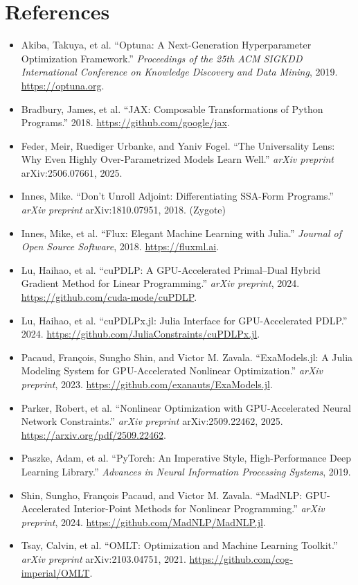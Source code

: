 \documentclass[11pt]{article}
\begin{document}
\section{References}
\begin{itemize}[leftmargin=1.5em]
  \item Akiba, Takuya, et al. ``Optuna: A Next-Generation Hyperparameter Optimization Framework.'' \emph{Proceedings of the 25th ACM SIGKDD International Conference on Knowledge Discovery and Data Mining}, 2019. \url{https://optuna.org}.
  \item Bradbury, James, et al. ``JAX: Composable Transformations of Python Programs.'' 2018. \url{https://github.com/google/jax}.
  \item Feder, Meir, Ruediger Urbanke, and Yaniv Fogel. ``The Universality Lens: Why Even Highly Over-Parametrized Models Learn Well.'' \emph{arXiv preprint} arXiv:2506.07661, 2025.
  \item Innes, Mike. ``Don't Unroll Adjoint: Differentiating SSA-Form Programs.'' \emph{arXiv preprint} arXiv:1810.07951, 2018. (Zygote)
  \item Innes, Mike, et al. ``Flux: Elegant Machine Learning with Julia.'' \emph{Journal of Open Source Software}, 2018. \url{https://fluxml.ai}.
  \item Lu, Haihao, et al. ``cuPDLP: A GPU-Accelerated Primal–Dual Hybrid Gradient Method for Linear Programming.'' \emph{arXiv preprint}, 2024. \url{https://github.com/cuda-mode/cuPDLP}.
  \item Lu, Haihao, et al. ``cuPDLPx.jl: Julia Interface for GPU-Accelerated PDLP.'' 2024. \url{https://github.com/JuliaConstraints/cuPDLPx.jl}.
  \item Pacaud, François, Sungho Shin, and Victor M. Zavala. ``ExaModels.jl: A Julia Modeling System for GPU-Accelerated Nonlinear Optimization.'' \emph{arXiv preprint}, 2023. \url{https://github.com/exanauts/ExaModels.jl}.
  \item Parker, Robert, et al. ``Nonlinear Optimization with GPU-Accelerated Neural Network Constraints.'' \emph{arXiv preprint} arXiv:2509.22462, 2025. \url{https://arxiv.org/pdf/2509.22462}.
  \item Paszke, Adam, et al. ``PyTorch: An Imperative Style, High-Performance Deep Learning Library.'' \emph{Advances in Neural Information Processing Systems}, 2019.
  \item Shin, Sungho, François Pacaud, and Victor M. Zavala. ``MadNLP: GPU-Accelerated Interior-Point Methods for Nonlinear Programming.'' \emph{arXiv preprint}, 2024. \url{https://github.com/MadNLP/MadNLP.jl}.
  \item Tsay, Calvin, et al. ``OMLT: Optimization and Machine Learning Toolkit.'' \emph{arXiv preprint} arXiv:2103.04751, 2021. \url{https://github.com/cog-imperial/OMLT}.
\end{itemize}
\end{document}
